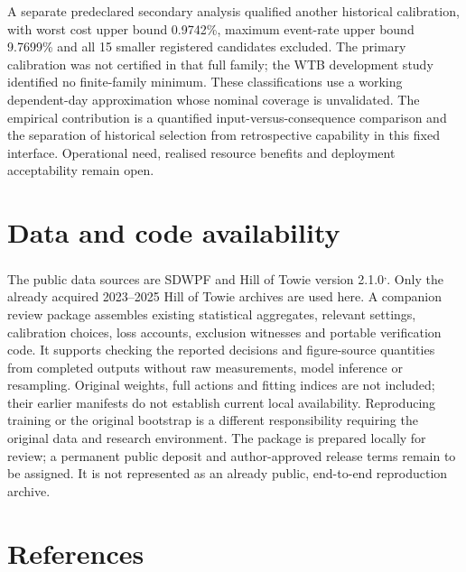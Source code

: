 \documentclass[
  british,
  11pt,
]{article}
\begin{document}
A separate predeclared secondary analysis qualified another historical
calibration, with worst cost upper bound 0.9742\%, maximum event-rate
upper bound 9.7699\% and all 15 smaller registered candidates excluded.
The primary calibration was not certified in that full family; the WTB
development study identified no finite-family minimum. These
classifications use a working dependent-day approximation whose nominal
coverage is unvalidated. The empirical contribution is a quantified
input-versus-consequence comparison and the separation of historical
selection from retrospective capability in this fixed interface.
Operational need, realised resource benefits and deployment
acceptability remain open.

\section*{Data and code availability}\label{data-and-code-availability}

The public data sources are SDWPF and Hill of Towie version
2.1.0\textsuperscript{,}.
Only the already acquired 2023--2025 Hill of Towie archives are used
here. A companion review package assembles existing statistical
aggregates, relevant settings, calibration choices, loss accounts,
exclusion witnesses and portable verification code. It supports checking
the reported decisions and figure-source quantities from completed
outputs without raw measurements, model inference or resampling.
Original weights, full actions and fitting indices are not included;
their earlier manifests do not establish current local availability.
Reproducing training or the original bootstrap is a different
responsibility requiring the original data and research environment. The
package is prepared locally for review; a permanent public deposit and
author-approved release terms remain to be assigned. It is not
represented as an already public, end-to-end reproduction archive.

\section*{References}\label{references}
\end{document}
